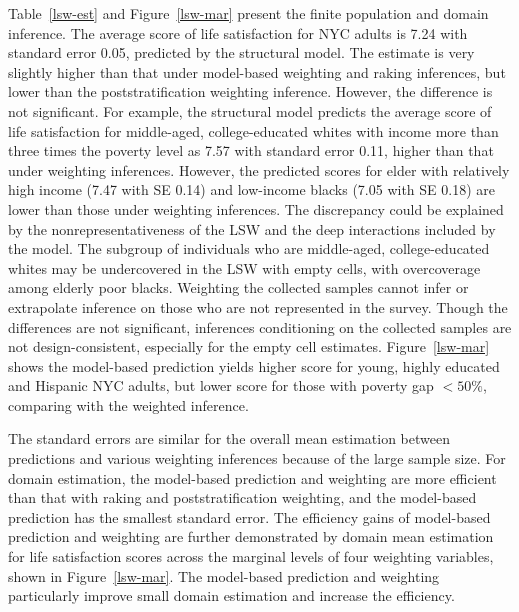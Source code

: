 \documentclass[11pt]{article}
\begin{document}
Table~\ref{lsw-est} and Figure~\ref{lsw-mar} present the finite population and domain inference. The average score of life satisfaction for NYC adults is 7.24 with standard error 0.05, predicted by the structural model. The estimate is very slightly higher than that under model-based weighting and raking inferences, but lower than the poststratification weighting inference. However, the difference is not significant. For example, the structural model predicts the average score of life satisfaction for middle-aged, college-educated whites with income more than three times the poverty level as
 7.57 with standard error 0.11, higher than that under weighting inferences. However, the predicted scores for elder with relatively high income (7.47 with SE 0.14) and low-income blacks (7.05 with SE 0.18) are lower than those under weighting inferences. The discrepancy could be explained by the nonrepresentativeness of the LSW and the deep interactions included by the model. The subgroup of individuals who are middle-aged, college-educated whites may be undercovered in the LSW with empty cells, with overcoverage among elderly poor blacks. Weighting the collected samples cannot infer or extrapolate inference on those who are not represented in the survey. Though the differences are not significant, inferences conditioning on the collected samples are not design-consistent, especially for the empty cell estimates. Figure~\ref{lsw-mar} shows the model-based prediction yields higher score for young, highly educated and Hispanic NYC adults, but lower score for those with poverty gap $<50\%$, comparing with the weighted inference.

The standard errors are similar for the overall mean estimation between predictions and various weighting inferences because of the large sample size. For domain estimation, the model-based prediction and weighting are more efficient than that with raking and poststratification weighting, and the model-based prediction has the smallest standard error. The efficiency gains of model-based prediction and weighting are further demonstrated by domain mean estimation for life satisfaction scores across the marginal levels of four weighting variables, shown in Figure~\ref{lsw-mar}. The model-based prediction and weighting particularly improve small domain estimation and increase the efficiency. 
\end{document}
